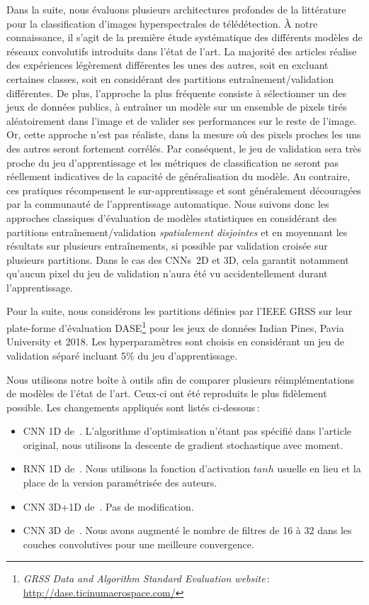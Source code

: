 Dans la suite, nous évaluons plusieurs architectures profondes de la littérature pour la classification d'images hyperspectrales de télédétection. À notre connaissance, il s'agit de la première étude systématique des différents modèles de réseaux convolutifs introduits dans l'état de l'art. La majorité des articles réalise des expériences légèrement différentes les unes des autres, soit en excluant certaines classes, soit en considérant des partitions entraînement/validation différentes. De plus, l'approche la plus fréquente consiste à sélectionner un des jeux de données publics, à entraîner un modèle sur un ensemble de pixels tirés aléatoirement dans l'image et de valider ses performances sur le reste de l'image. Or, cette approche n'est pas réaliste, dans la mesure où des pixels proches les uns des autres seront fortement corrélés. Par conséquent, le jeu de validation sera très proche du jeu d'apprentissage et les métriques de classification ne seront pas réellement indicatives de la capacité de généralisation du modèle. Au contraire, ces pratiques récompensent le sur-apprentissage et sont généralement découragées par la communauté de l'apprentissage automatique. Nous suivons donc les approches classiques d'évaluation de modèles statistiques en considérant des partitions entraînement/validation \emph{spatialement disjointes} et en moyennant les résultats sur plusieurs entraînements, si possible par validation croisée sur plusieurs partitions. Dans le cas des \glspl{CNN}~2D et 3D, cela garantit notamment qu'aucun pixel du jeu de validation n'aura été vu accidentellement durant l'apprentissage.

Pour la suite, nous considérons les partitions définies par l'\gls{IEEE} \gls{GRSS} sur leur plate-forme d'évaluation DASE\footnote{\emph{GRSS Data and Algorithm Standard Evaluation website}\,: \url{http://dase.ticinumaerospace.com/}} pour les jeux de données Indian Pines, Pavia University et  2018. Les hyperparamètres sont choisis en considérant un jeu de validation séparé incluant 5\% du jeu d'apprentissage.

Nous utilisons notre boîte à outils afin de comparer plusieurs réimplémentations de modèles de l'état de l'art. Ceux-ci ont été reproduits le plus fidèlement possible. Les changements appliqués sont listés ci-dessous\,:
\begin{itemize}
	\item \gls{CNN} 1D de~\citet{hu_deep_2015}. L'algorithme d'optimisation n'étant pas spécifié dans l'article original, nous utilisons la descente de gradient stochastique avec moment.
    \item \gls{RNN} 1D de~\citet{mou_deep_2017}. Nous utilisons la fonction d'activation $tanh$ usuelle en lieu et la place de la version paramétrisée des auteurs.
    \item \gls{CNN} 3D+1D de~\citet{ben_hamida_deep_2016}. Pas de modification.
    \item \gls{CNN} 3D de~\citet{li_spectralspatial_2017}. Nous avons augmenté le nombre de filtres de 16 à 32 dans les couches convolutives pour une meilleure convergence.
\end{itemize}

